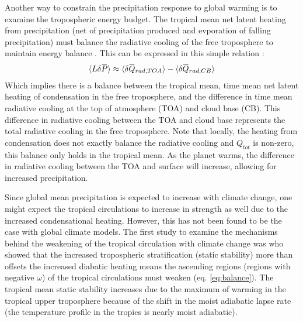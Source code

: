 \documentclass[letterpaper,12pt,titlepage,oneside,final]{book}
\newcommand{\overbar}[1]{\mkern 1.5mu\overline{\mkern-1.5mu#1\mkern-1.5mu}\mkern 1.5mu}
\begin{document}
Another way to constrain the precipitation response to global warming is to examine the tropospheric energy budget. The tropical mean net latent heating from precipitation (net of precipitation produced and evporation of falling precipitation) must balance the radiative cooling of the free troposphere to maintain energy balance \citep{mitchell_co2_1987,takahashi_radiative_2009,ogorman_energetic_2012,su_tightening_2017}. This can be expressed in this simple relation \citep[from][]{ogorman_energetic_2012}:
\begin{align}\label{eq:tropbal}
\langle{L}\delta{\overbar{P}}\rangle\approx\langle\delta{\overbar{Q}_{rad,TOA}}\rangle-\langle\delta{\overbar{Q}_{rad,CB}}\rangle
\end{align}
Which implies there is a balance between the tropical mean, time mean net latent heating of condensation in the free troposphere, and the difference in time mean radiative cooling at the top of atmosphere (TOA) and cloud base (CB). This difference in radiative cooling between the TOA and cloud base represents the total radiative cooling in the free troposphere. Note that locally, the heating from condensation does not exactly balance the radiative cooling and $Q_{tot}$ is non-zero, this balance only holds in the tropical mean. As the planet warms, the difference in radiative cooling between the TOA and surface will increase, allowing for increased precipitation.


Since global mean precipitation is expected to increase with climate change, one might expect the tropical circulations to increase in strength as well due to the increased condensational heating. However, this has not been found to be the case with global climate models. The first study to examine the mechanisms behind the weakening of the tropical circulation with climate change was \citep{knutson_time-mean_1995} who showed that the increased tropospheric stratification (static stability) more than offsets the increased diabatic heating means the ascending regions (regions with negative $\omega$) of the tropical circulations must weaken (eq. \ref{eq:balance}). The tropical mean static stability increases due to the maximum of warming in the tropical upper troposphere because of the shift in the moist adiabatic lapse rate (the temperature profile in the tropics is nearly moist adiabatic).
\end{document}
